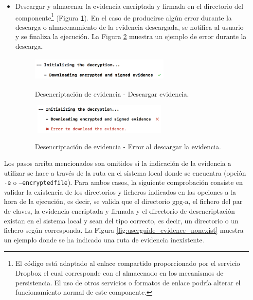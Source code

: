 \documentclass[12pt,a4paper, twoside]{report}
\begin{document}
\begin{itemize}
		\item Descargar y almacenar la evidencia encriptada y firmada en el directorio del componente\footnote{El código está adaptado al enlace compartido proporcionado por el servicio Dropbox el cual corresponde con el almacenado en los mecanismos de persistencia. El uso de otros servicios o formatos de enlace podría alterar el funcionamiento normal de este componente.} (Figura \ref{fig:userguide_evidence_download}).	En el caso de producirse algún error durante la descarga o almacenamiento de la evidencia descargada, se notifica al usuario y se finaliza la ejecución. La Figura \ref{fig:userguide_evidence_error_download} muestra un ejemplo de error durante la descarga.
				
			\begin{figure}[!ht]   
				\caption{Desencriptación de evidencia - Descargar evidencia.} 
				\begin{center} 
					\includegraphics[width=7cm,height=1.2cm]{Images/userGuide/evidence/download} \\
					\label{fig:userguide_evidence_download} 
				\end{center}  
			\end{figure}
			
			\begin{figure}[!ht]   
				\caption{Desencriptación de evidencia - Error al descargar la evidencia.} 
				\begin{center} 
					\includegraphics[width=7cm,height=1.5cm]{Images/userGuide/evidence/error_download} \\
					\label{fig:userguide_evidence_error_download} 
				\end{center}  
			\end{figure}
			
	\end{itemize}
	
	Los pasos arriba mencionados son omitidos si la indicación de la evidencia a utilizar se hace a través de la ruta en el sistema local donde se encuentra (opción \texttt{-e} o \texttt{--encryptedfile}). Para ambos casos, la siguiente comprobación consiste en validar la existencia de los directorios y ficheros indicados en las opciones a la hora de la ejecución, es decir, se valida que el directorio \gls{gpg-a}, el fichero del par de claves, la evidencia encriptada y firmada y el directorio de desencriptación existan en el sistema local y sean del tipo correcto, es decir, un directorio o un fichero según corresponda. La Figura \ref{fig:userguide_evidence_nonexist} muestra un ejemplo donde se ha indicado una ruta de evidencia inexistente.
		
\end{document}
